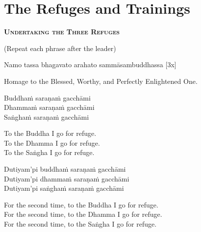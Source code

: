 
\section{The Refuges and Trainings}

\begin{center}
  \textbf{\textsc{Undertaking the Three Refuges}}\makeatletter\hyperlink{endnote138-appendix}\makeatother
\end{center}

\begin{center}
  (Repeat each phrase after the leader)
\end{center}

Namo tassa bhagavato arahato sammāsambuddhassa \hfill{[3x]}

\begin{english-hang}
  Homage to the Blessed, Worthy, and Perfectly Enlightened One.
\end{english-hang}

Buddhaṁ saraṇaṁ gacchāmi\\
Dhammaṁ saraṇaṁ gacchāmi\\
Saṅghaṁ saraṇaṁ gacchāmi

\begin{english-verses}
  To the Buddha I go for refuge.\\
  To the Dhamma I go for refuge.\\
  To the Saṅgha I go for refuge.
\end{english-verses}

Dutiyam'pi buddhaṁ saraṇaṁ gacchāmi\\
Dutiyam'pi dhammaṁ saraṇaṁ gacchāmi\\
Dutiyam'pi saṅghaṁ saraṇaṁ gacchāmi

\begin{english-verses}
  For the second time, to the Buddha I go for refuge.\\
  For the second time, to the Dhamma I go for refuge.\\
  For the second time, to the Saṅgha I go for refuge.
\end{english-verses}

\ifninebythirteenversion\clearpage\fi


